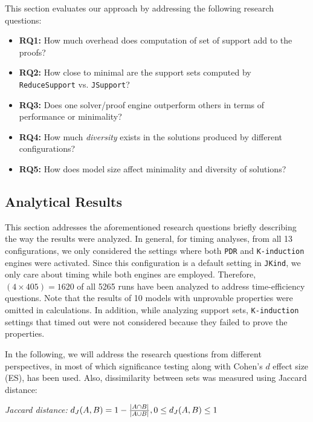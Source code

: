 This section evaluates our approach by addressing the following research questions:

\begin{itemize}
    \item \textbf{RQ1:} How much overhead does computation of set of support add to the proofs?
    \item \textbf{RQ2:} How close to minimal are the support sets computed by \texttt{ReduceSupport} vs. \texttt{JSupport}?
    \item \textbf{RQ3:} Does one solver/proof engine outperform others in terms of performance or minimality?
    \item \textbf{RQ4:} How much {\em diversity} exists in the solutions produced by different configurations?
    \item \textbf{RQ5:} How does model size affect minimality and diversity of solutions?
\end{itemize}

\subsection{Analytical Results}
\label{sec:res}
This section addresses the aforementioned research questions briefly describing the way the results were analyzed. In general, for timing analyses, from all 13 configurations, we only considered the settings where both \texttt{PDR} and \texttt{K-induction} engines were activated. Since this configuration is a default setting in \texttt{\texttt{JKind}}, we only care about timing while both engines are employed. Therefore, $(4 \times 405) = 1620$ of all 5265 runs have been analyzed to address time-efficiency questions.
Note that  the results of 10 models with unprovable properties were omitted in calculations. In addition,
 while analyzing support sets, \texttt{K-induction} settings that timed out were not considered because they failed to prove the properties.

In the following, we will address the research questions from different perspectives, in most of which significance testing along with Cohen's $d$ effect size (ES), has been used. Also, dissimilarity between sets was measured using Jaccard distance:
\begin{definition}{\emph{Jaccard distance:}}
  \label{def:dj}
  $d_J(\small{A}, \small{B}) = 1 - \frac{|A \cap B|}{|A \cup B|} ,\\ 0 \leq d_J(\small{A}, \small{B}) \leq 1$
\end{definition}

